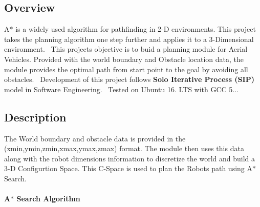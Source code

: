 \href{https://travis-ci.org/VBot2410/A_Star_3D}{\tt } \subsection*{\href{https://coveralls.io/github/VBot2410/A_Star_3D?branch=master}{\tt } }

\subsection*{Overview}

A$\ast$ is a widely used algorithm for pathfinding in 2-\/D environments. This project takes the planning algorithm one step further and applies it to a 3-\/\+Dimensional environment.~\newline
 This project\textquotesingle{}s objective is to buid a planning module for Aerial Vehicles. Provided with the world boundary and Obstacle location data, the module provides the optimal path from start point to the goal by avoiding all obstacles.~\newline
 Development of this project follows {\bfseries Solo Iterative Process (S\+IP)} model in Software Engineering.~\newline
 Tested on Ubuntu 16. L\+TS with G\+CC 5...

\subsection*{Description}

The World boundary and obstacle data is provided in the (xmin,ymin,zmin,xmax,ymax,zmax) format. The module then uses this data along with the robot dimensions information to discretize the world and build a 3-\/D Configurtion Space. This C-\/\+Space is used to plan the Robot\textquotesingle{}s path using A$\ast$ Search. \paragraph*{A$\ast$ Search Algorithm}

